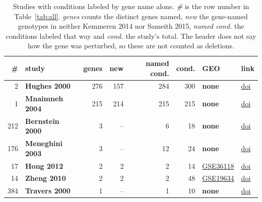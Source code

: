 \begin{table}[H]\centering
\footnotesize
\caption[]{Studies with conditions labeled by gene name alone. \emph{\#} is the
row number in Table~\ref{tab:all}. \emph{genes} counts the distinct genes named,
\emph{new} the gene-named genotypes in neither Kemmeren 2014 nor Sameith 2015,
\emph{named cond.} the conditions labeled that way and \emph{cond.} the study's
total. The header does not say how the gene was perturbed, so these are not
counted as deletions.}\label{tab:gene-named}
\begin{tabular}{rlrrrrll}
\toprule
\# & study & genes & new & named cond. & cond. & GEO & link \\
\midrule
2 & \textbf{Hughes 2000} & 276 & 157 & 284 & 300 & \textbf{none} & \href{https://doi.org/10.1016/s0092-8674(00)00015-5}{doi} \\
1 & \textbf{Mnaimneh 2004} & 215 & 214 & 215 & 215 & \textbf{none} & \href{https://doi.org/10.1016/j.cell.2004.06.013}{doi} \\
212 & \textbf{Bernstein 2000} & 3 & -- & 6 & 18 & \textbf{none} & \href{https://doi.org/10.1073/pnas.250477697}{doi} \\
176 & \textbf{Meneghini 2003} & 3 & -- & 12 & 24 & \textbf{none} & \href{https://doi.org/10.1016/s0092-8674(03)00123-5}{doi} \\
17 & \textbf{Hong 2012} & 2 & 2 & 2 & 14 & \href{https://www.ncbi.nlm.nih.gov/geo/query/acc.cgi?acc=GSE36118}{GSE36118} & \href{https://doi.org/10.1128/AEM.01444-12}{doi} \\
14 & \textbf{Zheng 2010} & 2 & 2 & 2 & 48 & \href{https://www.ncbi.nlm.nih.gov/geo/query/acc.cgi?acc=GSE19634}{GSE19634} & \href{https://doi.org/10.1038/nature08934}{doi} \\
384 & \textbf{Travers 2000} & 1 & -- & 1 & 10 & \textbf{none} & \href{https://doi.org/10.1016/s0092-8674(00)80835-1}{doi} \\
\bottomrule
\end{tabular}
\end{table}
